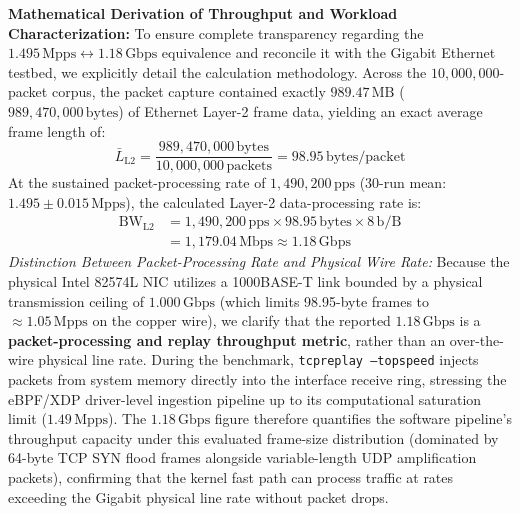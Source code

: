 \documentclass[journal]{IEEEtran}
\renewcommand{\_}{\textunderscore\allowbreak}
\begin{document}
\textbf{Mathematical Derivation of Throughput and Workload Characterization:}
To ensure complete transparency regarding the $1.495\,\text{Mpps} \leftrightarrow 1.18\,\text{Gbps}$ equivalence and reconcile it with the Gigabit Ethernet testbed, we explicitly detail the calculation methodology. Across the $10{,}000{,}000$-packet corpus, the packet capture contained exactly $989.47\,\text{MB}$ ($989{,}470{,}000\,\text{bytes}$) of Ethernet Layer-2 frame data, yielding an exact average frame length of:
\begin{equation}
  \bar{L}_{\text{L2}} = \frac{989{,}470{,}000\,\text{bytes}}{10{,}000{,}000\,\text{packets}} = 98.95\,\text{bytes/packet}
  \label{eq:avg_frame_size}
\end{equation}
At the sustained packet-processing rate of $1{,}490{,}200\,\text{pps}$ (30-run mean: $1.495 \pm 0.015\,\text{Mpps}$), the calculated Layer-2 data-processing rate is:
\begin{align}
  \text{BW}_{\text{L2}} &= 1{,}490{,}200\,\text{pps} \times 98.95\,\text{bytes} \times 8\,\text{b/B} \nonumber \\
  &= 1{,}179.04\,\text{Mbps} \approx 1.18\,\text{Gbps}
  \label{eq:l2_throughput}
\end{align}
\textit{Distinction Between Packet-Processing Rate and Physical Wire Rate:}
Because the physical Intel 82574L NIC utilizes a 1000BASE-T link bounded by a physical transmission ceiling of $1.000\,\text{Gbps}$ (which limits 98.95-byte frames to $\approx\!1.05\,\text{Mpps}$ on the copper wire), we clarify that the reported $1.18\,\text{Gbps}$ is a \textbf{packet-processing and replay throughput metric}, rather than an over-the-wire physical line rate. During the benchmark, \texttt{tcpreplay --topspeed} injects packets from system memory directly into the interface receive ring, stressing the eBPF/XDP driver-level ingestion pipeline up to its computational saturation limit ($1.49\,\text{Mpps}$). The $1.18\,\text{Gbps}$ figure therefore quantifies the software pipeline's throughput capacity under this evaluated frame-size distribution (dominated by 64-byte TCP SYN flood frames alongside variable-length UDP amplification packets), confirming that the kernel fast path can process traffic at rates exceeding the Gigabit physical line rate without packet drops.
\end{document}
